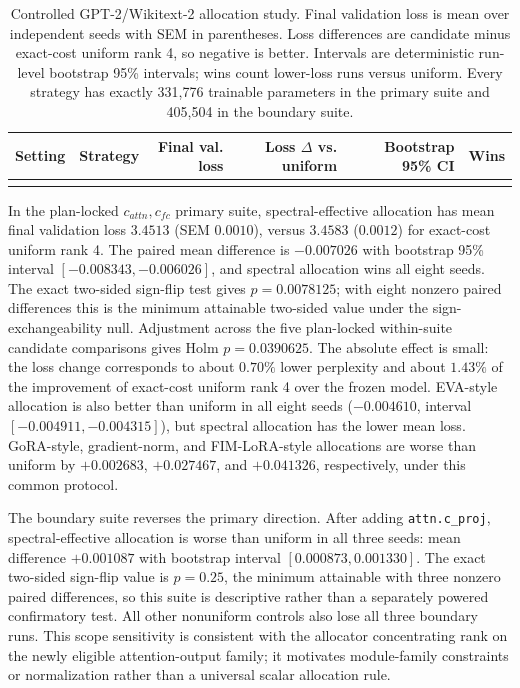 \documentclass[10pt,twocolumn]{article}
\theoremstyle{definition}
\begin{document}
\begin{table}[t]
\centering
\scriptsize
\caption{Controlled GPT-2/Wikitext-2 allocation study.  Final validation loss is mean over independent seeds with SEM in parentheses.  Loss differences are candidate minus exact-cost uniform rank 4, so negative is better.  Intervals are deterministic run-level bootstrap 95\% intervals; wins count lower-loss runs versus uniform.  Every strategy has exactly 331,776 trainable parameters in the primary suite and 405,504 in the boundary suite.}
\label{tab:real-gpt2}
\begin{tabular}{llrrrr}
\toprule
Setting & Strategy & Final val. loss & Loss $\Delta$ vs. uniform & Bootstrap 95\% CI & Wins \\
\midrule
\\
\bottomrule
\end{tabular}
\end{table}

In the plan-locked $c_{attn},c_{fc}$ primary suite, spectral-effective allocation has mean final validation loss $3.4513$ (SEM $0.0010$), versus $3.4583$ ($0.0012$) for exact-cost uniform rank 4.  The paired mean difference is $-0.007026$ with bootstrap 95\% interval $[-0.008343,-0.006026]$, and spectral allocation wins all eight seeds.  The exact two-sided sign-flip test gives $p=0.0078125$; with eight nonzero paired differences this is the minimum attainable two-sided value under the sign-exchangeability null.  Adjustment across the five plan-locked within-suite candidate comparisons gives Holm $p=0.0390625$.  The absolute effect is small: the loss change corresponds to about $0.70\%$ lower perplexity and about $1.43\%$ of the improvement of exact-cost uniform rank 4 over the frozen model.  EVA-style allocation is also better than uniform in all eight seeds ($-0.004610$, interval $[-0.004911,-0.004315]$), but spectral allocation has the lower mean loss.  GoRA-style, gradient-norm, and FIM-LoRA-style allocations are worse than uniform by $+0.002683$, $+0.027467$, and $+0.041326$, respectively, under this common protocol.

The boundary suite reverses the primary direction.  After adding \texttt{attn.c\_proj}, spectral-effective allocation is worse than uniform in all three seeds: mean difference $+0.001087$ with bootstrap interval $[0.000873,0.001330]$.  The exact two-sided sign-flip value is $p=0.25$, the minimum attainable with three nonzero paired differences, so this suite is descriptive rather than a separately powered confirmatory test.  All other nonuniform controls also lose all three boundary runs.  This scope sensitivity is consistent with the allocator concentrating rank on the newly eligible attention-output family; it motivates module-family constraints or normalization rather than a universal scalar allocation rule.
\end{document}
